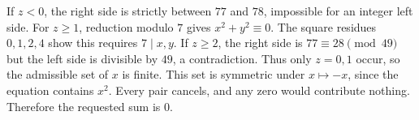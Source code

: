 If $z<0$, the right side is strictly between $77$ and $78$, impossible for an integer left side. For $z\ge1$, reduction modulo $7$ gives $x^2+y^2\equiv0$. The square residues $0,1,2,4$ show this requires $7\mid x,y$. If $z\ge2$, the right side is $77\equiv28\pmod{49}$ but the left side is divisible by $49$, a contradiction. Thus only $z=0,1$ occur, so the admissible set of $x$ is finite. This set is symmetric under $x\mapsto-x$, since the equation contains $x^2$. Every pair cancels, and any zero would contribute nothing. Therefore the requested sum is $\boxed0$.
